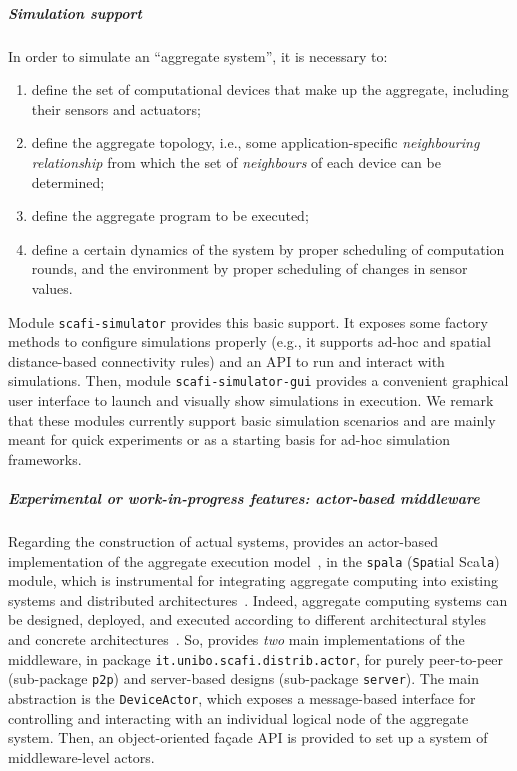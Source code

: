 \subparagraph*{Simulation support}
%
In order to simulate an ``aggregate system'',
 it is necessary to: 
\begin{enumerate}
  \item define the set of computational devices that make up the aggregate, including their sensors and actuators;
  \item define the aggregate topology, i.e., 
  some application-specific \emph{neighbouring relationship}
  from which the set of \emph{neighbours}
  of each device can be determined;
  \item define the aggregate program to be executed;
  \item define a certain dynamics of the system
  by proper scheduling of computation rounds,
  and the environment
  by proper scheduling of changes in sensor values.
\end{enumerate}

%
Module \texttt{scafi-simulator}
 provides this basic support.
%
It exposes some factory methods
to configure simulations properly
 (e.g., it supports ad-hoc and spatial distance-based connectivity rules)
 and an API to run and interact with simulations.
%
Then, module \texttt{scafi-simulator-gui}
 provides a convenient graphical user interface
 to launch and visually show simulations in execution.
%
We remark that these modules currently support basic simulation scenarios
 and are mainly meant for quick experiments
 or as a starting basis for ad-hoc simulation frameworks.
 
\subparagraph*{Experimental or work-in-progress features: actor-based middleware}
%
Regarding the construction of actual systems, 
 \scafi{}
 provides
 an actor-based implementation
 of the aggregate execution model~\cite{DBLP:series/lncs/CasadeiV18},
 in the \texttt{spala} (\texttt{Spa}tial Sca\texttt{la}) module,
 which is instrumental for integrating aggregate computing
 into existing systems and distributed architectures~\cite{DBLP:series/lncs/CasadeiV18}.
%
Indeed, aggregate computing systems
 can be designed, deployed, and executed 
 according to different
 architectural styles 
 and concrete architectures~\cite{DBLP:journals/fi/CasadeiPPVW20}.
%
So, \scafi{} provides \emph{two} main implementations of the middleware,
 in package \texttt{it.unibo.scafi.distrib.actor},
 for purely peer-to-peer 
 (sub-package \texttt{p2p})
 and server-based designs
 (sub-package \texttt{server}).
%
The main abstraction
 is the \texttt{DeviceActor},
 which exposes a message-based interface
 for controlling and interacting with
 an individual logical node of the aggregate system.
%
Then, an object-oriented façade API is provided to set up a system of middleware-level actors. 

